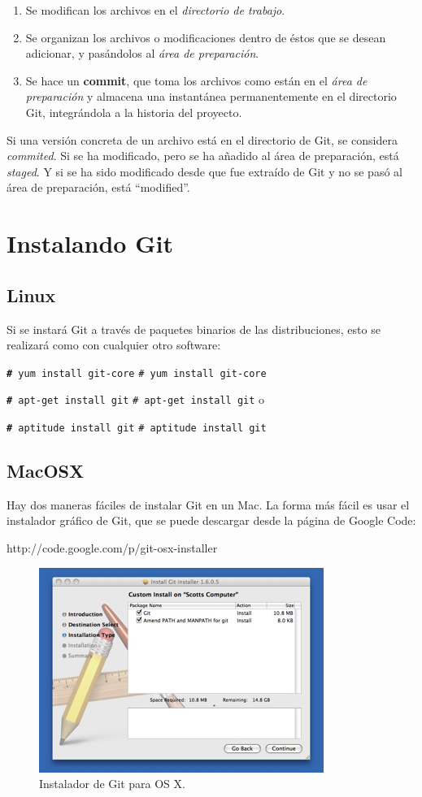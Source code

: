 \documentclass[12pt, spanish, oneside, onecolumn, a4paper]{report}
\newcommand{\rootshellcmd}[1]{
  \colorbox{mygray}{
    \indent\indent\texttt{\textbf{\footnotesize\#} #1}
  } 
  \indent\indent\texttt{\footnotesize\# #1}
}
\begin{document}
\begin{enumerate} 
\item Se modifican los archivos en el 
  \emph{directorio de trabajo}. 
\item Se organizan los archivos o modificaciones dentro de éstos que se desean adicionar, y pasándolos al 
  \emph{área de preparación}.

\item Se hace un 
  \textbf{commit}, que toma los archivos como están en el 
  \emph{área de preparación} y almacena una instantánea permanentemente en el directorio Git, integrándola a la historia del proyecto. 
\end{enumerate} Si una versión concreta de un archivo está en el directorio de Git, se considera 
\emph{commited}. Si se ha modificado, pero se ha añadido al área de preparación, está 
\emph {staged}. Y si se ha sido modificado desde que fue extraído de Git y no se pasó al área de preparación, está ``modified''. 

\section{Instalando Git} 
\label{sec:installgit} 

\subsection{Linux} 
\label{sec:installlinux} Si se instará Git a través de paquetes binarios de las distribuciones, esto se realizará como con cualquier otro software: 
\rootshellcmd{yum install git-core} 
\rootshellcmd{apt-get install git} o 
\rootshellcmd{aptitude install git} 

\subsection{MacOSX} 
\label{sec:installmac}

Hay dos maneras fáciles de instalar Git en un Mac. La forma más fácil es usar el instalador gráfico de Git, que se puede descargar desde la página de Google Code: 
\begin{verbatim*} http://code.google.com/p/git-osx-installer 
\end{verbatim*} 
\begin{figure} 
  \begin{center} 
    \includegraphics[width=.6\textwidth,keepaspectratio=true]{18333fig0107-tn.png} 
  \end{center} 
  \caption{ Instalador de Git para OS X.} 
\end{figure} 
\clearpage
\end{document}
